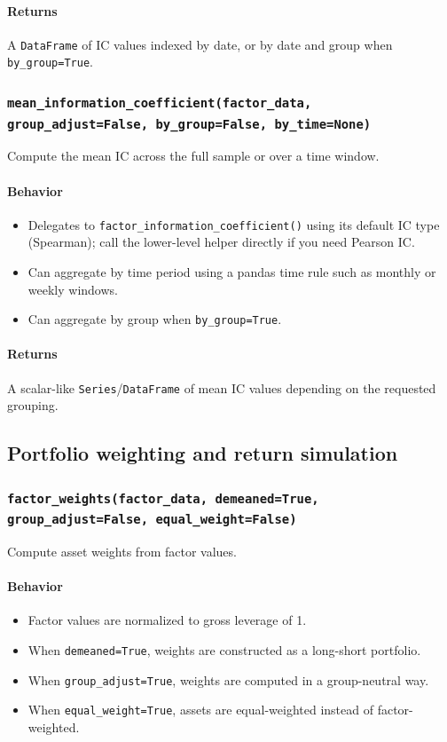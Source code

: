 \documentclass[11pt]{article}
\begin{document}
\paragraph{Returns}
A \texttt{DataFrame} of IC values indexed by date, or by date and group when \texttt{by\_group=True}.

\subsubsection{\texttt{mean\_information\_coefficient(factor\_data, group\_adjust=False, by\_group=False, by\_time=None)}}
Compute the mean IC across the full sample or over a time window.

\paragraph{Behavior}
\begin{itemize}
  \item Delegates to \texttt{factor\_information\_coefficient()} using its default IC type (Spearman); call the lower-level helper directly if you need Pearson IC.
  \item Can aggregate by time period using a pandas time rule such as monthly or weekly windows.
  \item Can aggregate by group when \texttt{by\_group=True}.
\end{itemize}

\paragraph{Returns}
A scalar-like \texttt{Series}/\texttt{DataFrame} of mean IC values depending on the requested grouping.

\subsection{Portfolio weighting and return simulation}

\subsubsection{\texttt{factor\_weights(factor\_data, demeaned=True, group\_adjust=False, equal\_weight=False)}}
Compute asset weights from factor values.

\paragraph{Behavior}
\begin{itemize}
  \item Factor values are normalized to gross leverage of 1.
  \item When \texttt{demeaned=True}, weights are constructed as a long-short portfolio.
  \item When \texttt{group\_adjust=True}, weights are computed in a group-neutral way.
  \item When \texttt{equal\_weight=True}, assets are equal-weighted instead of factor-weighted.
\end{itemize}
\end{document}
